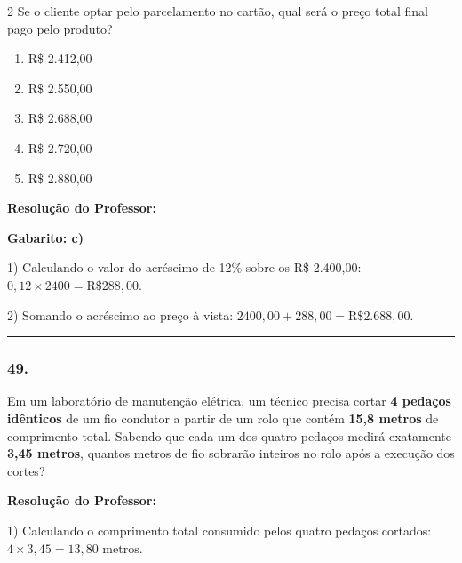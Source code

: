 \begin{multicols*}{2}
Se o cliente optar pelo parcelamento no cartão, qual será o preço total final pago pelo produto?
\begin{enumerate}[label=\alph*), itemsep=\espacoAlt]
    \item R\$ 2.412,00
    \item R\$ 2.550,00
    \item R\$ 2.688,00
    \item R\$ 2.720,00
    \item R\$ 2.880,00
\end{enumerate}

\ifgabarito
    \begin{tcolorbox}[colback=CorTitUm!5, colframe=CorTitUm, boxrule=1pt, arc=4pt, left=6pt, right=6pt, top=6pt, bottom=6pt]
    \small\textbf{\textcolor{CorTitUm}{Resolução do Professor:}}\par\vspace{0.1cm}
    \color{CinzaEscuro}
    \textbf{Gabarito: c)}
    
    1) Calculando o valor do acréscimo de 12\% sobre os R\$ 2.400,00:
    $0,12 \times 2400 = \text{R\$ } 288,00$.
    
    2) Somando o acréscimo ao preço à vista:
    $2400,00 + 288,00 = \text{R\$ } 2.688,00$.
    \end{tcolorbox}
\fi

\par\vspace{\espacoQuestao}

\noindent\textcolor{CorLinha}{\rule{\linewidth}{0.5pt}} 
\par\vspace{\espacoPreQuestao}
\subsubsection*{49.} Em um laboratório de manutenção elétrica, um técnico precisa cortar \textbf{4 pedaços idênticos} de um fio condutor a partir de um rolo que contém \textbf{15,8 metros} de comprimento total. Sabendo que cada um dos quatro pedaços medirá exatamente \textbf{3,45 metros}, quantos metros de fio sobrarão inteiros no rolo após a execução dos cortes?

\ifgabarito
    \begin{tcolorbox}[colback=CorTitUm!5, colframe=CorTitUm, boxrule=1pt, arc=4pt, left=6pt, right=6pt, top=6pt, bottom=6pt]
    \small\textbf{\textcolor{CorTitUm}{Resolução do Professor:}}\par\vspace{0.1cm}
    \color{CinzaEscuro}
    1) Calculando o comprimento total consumido pelos quatro pedaços cortados:
    $4 \times 3,45 = 13,80\text{ metros}$.
    

\end{tcolorbox}
\end{multicols*}
